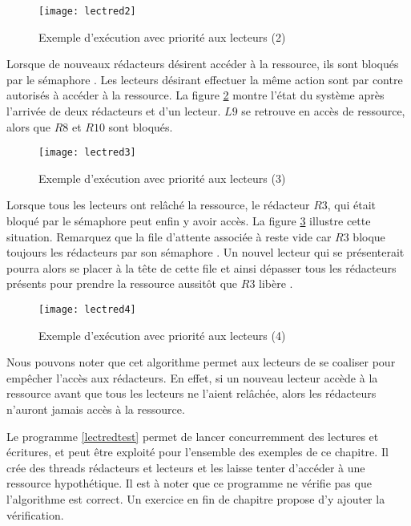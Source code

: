 \begin{figure}[!ht]
  \begin{center}
    \texttt{[image: lectred2]}
    \caption{\label{fig:lectred2}Exemple d'exécution avec priorité aux lecteurs (2)}
  \end{center}
\end{figure}

Lorsque de nouveaux rédacteurs désirent accéder à la ressource, ils sont bloqués par le sémaphore . Les lecteurs désirant effectuer la même action sont par contre autorisés à accéder à la ressource. La figure \ref{fig:lectred3} montre l'état du système après l'arrivée de deux rédacteurs et d'un lecteur. $L9$ se retrouve en accès de ressource, alors que $R8$ et $R10$ sont bloqués.

\begin{figure}[!ht]
  \begin{center}
    \texttt{[image: lectred3]}
    \caption{\label{fig:lectred3}Exemple d'exécution avec priorité aux lecteurs (3)}
  \end{center}
\end{figure}

Lorsque tous les lecteurs ont relâché la ressource, le rédacteur $R3$, qui était bloqué par le sémaphore  peut enfin y avoir accès.
La figure \ref{fig:lectred4} illustre cette situation.
Remarquez que la file d'attente associée à  reste vide car $R3$ bloque toujours les rédacteurs par son sémaphore . Un nouvel lecteur qui se présenterait pourra alors se placer à la tête de cette file et ainsi dépasser tous les rédacteurs présents pour prendre la ressource aussitôt que $R3$ libère .

\begin{figure}[!ht]
  \begin{center}
    \texttt{[image: lectred4]}
    \caption{\label{fig:lectred4}Exemple d'exécution avec priorité aux lecteurs (4)}
  \end{center}
\end{figure}

Nous pouvons noter que cet algorithme permet aux lecteurs de se coaliser pour empêcher l'accès aux rédacteurs. En effet, si un nouveau lecteur accède à la ressource avant que tous les lecteurs ne l'aient relâchée, alors les rédacteurs n'auront jamais accès à la ressource.

Le programme \ref{lectredtest} permet de lancer concurremment des lectures et écritures, et peut être exploité pour l'ensemble des exemples de ce chapitre. Il crée des threads rédacteurs et lecteurs et les laisse tenter d'accéder à une ressource hypothétique. Il est à noter que ce programme ne vérifie pas que l'algorithme est correct. Un exercice en fin de chapitre propose d'y ajouter la vérification.

